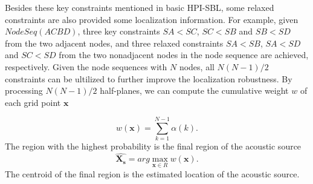 Besides these key constraints mentioned in basic HPI-SBL, some relaxed constraints are also provided some localization information.
For example, given $NodeSeq (A C B D)$, three key constraints $SA<SC$, $SC<SB$ and $SB<SD$ from the two adjacent nodes,
and three relaxed constraints $SA<SB$, $SA<SD$ and $SC<SD$ from the two nonadjacent nodes in the node sequence are achieved, respectively. 
Given the node sequences with $N$ nodes, all  $N(N - 1)/2$  constraints can be ultilized to further improve the localization robustness.
By processing  $N(N - 1)/2$ half-planes, we can compute the cumulative weight $w$ of each grid point $\bm{x}$

\begin{equation}\label{eq2}
w(\bm{x})=\sum\limits_{k=1} ^{N-1}\alpha(k).
\end{equation}
The region with the highest probability is the final region of the acoustic source
\begin{equation}\label{eq3}
\hat{\bm{X_s}}=arg \max_{\bm{x} \in R}w(\bm{x}).
\end{equation}
The centroid of the final region is the estimated location of the acoustic source.








